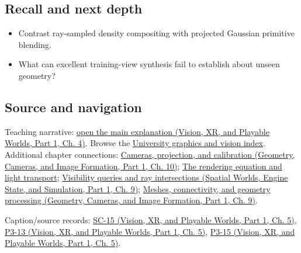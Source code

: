 \subsection{Recall and next depth}\label{appendix-c5b332e400e7-recall-and-next-depth}

\hypertarget{appendix-c5b332e400e7-recall-and-next-depth}{}

\begin{itemize}
\tightlist
\item
  Contrast ray-sampled density compositing with projected Gaussian primitive blending.
\item
  What can excellent training-view synthesis fail to establish about unseen geometry?
\end{itemize}

\subsection{Source and navigation}\label{appendix-c5b332e400e7-source-and-navigation}

\hypertarget{appendix-c5b332e400e7-source-and-navigation}{}

Teaching narrative: \href{../07-Vision-XR-and-Playable-Worlds-P01/main.pdf\#nameddest=04-visual-computing-ii-ch034-learned-representations-of-3d-shape-and-scenes}{open the main explanation (Vision, XR, and Playable Worlds, Part 1, Ch. 4)}. Browse the \hyperref[appendix-a6d556a4ef50-university-graphics-vision-and-photography---independent-series]{University graphics and vision index}. Additional chapter connections: \href{../03-Geometry-Cameras-and-Image-Formation-P01/main.pdf\#nameddest=03-visual-computing-i-ch003-cameras-projection-and-calibration}{Cameras, projection, and calibration (Geometry, Cameras, and Image Formation, Part 1, Ch. 10)}; \hyperref[03-visual-computing-i-ch007-the-rendering-equation-and-light-transport]{The rendering equation and light transport}; \href{../05-Spatial-Worlds-Engine-State-and-Simulation-P01/main.pdf\#nameddest=04-visual-computing-ii-ch028-visibility-queries-and-ray-intersections-1}{Visibility queries and ray intersections (Spatial Worlds, Engine State, and Simulation, Part 1, Ch. 9)}; \href{../03-Geometry-Cameras-and-Image-Formation-P01/main.pdf\#nameddest=03-visual-computing-i-ch002-meshes-connectivity-and-geometry-processing}{Meshes, connectivity, and geometry processing (Geometry, Cameras, and Image Formation, Part 1, Ch. 9)}.

Caption/source records: \href{../07-Vision-XR-and-Playable-Worlds-P01/main.pdf\#nameddest=04-visual-computing-ii-ch036-sc-15---stanford-cs231n-deep-learning-for-computer-vision-spring-2025-lecture-15-3d-vision}{SC-15 (Vision, XR, and Playable Worlds, Part 1, Ch. 5)}, \href{../07-Vision-XR-and-Playable-Worlds-P01/main.pdf\#nameddest=04-visual-computing-ii-ch036-p3-13---curves-and-surfaces}{P3-13 (Vision, XR, and Playable Worlds, Part 1, Ch. 5)}, \href{../07-Vision-XR-and-Playable-Worlds-P01/main.pdf\#nameddest=04-visual-computing-ii-ch036-p3-15---ray-tracing}{P3-15 (Vision, XR, and Playable Worlds, Part 1, Ch. 5)}.
